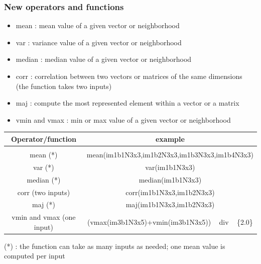 \documentclass[8pt]{beamer}
\begin{document}
\begin{frame}
\frametitle{New operators and functions}


\begin{itemize}
\item mean   : mean value of a given vector or neighborhood 
\item var    : variance value of a given vector or neighborhood 
\item median : median value of a given vector or neighborhood 
\item corr   : correlation between two vectors or matrices of the same dimensions (the function takes two inputs)
\item maj    : compute the most represented element within a vector or a matrix 
\item vmin and vmax : min or max value of a given vector or neighborhood 
\end{itemize}


\begin{center}
\begin{tabular}{c | c }
Operator/function & example \\
\hline \\
mean (*) & mean(im1b1N3x3,im1b2N3x3,im1b3N3x3,im1b4N3x3) \\
var (*) & var(im1b1N3x3) \\
median (*) & median(im1b1N3x3) \\
corr (two inputs) & corr(im1b1N3x3,im1b2N3x3) \\
maj (*) & maj(im1b1N3x3,im1b2N3x3) \\
vmin and vmax (one input) & (vmax(im3b1N3x5)+vmin(im3b1N3x5)) ~ div ~ \{2.0\} \\
\end{tabular}
\end{center}

(*) : the function can take as many inputs as needed; one mean value is computed per input
\end{frame}
\end{document}
